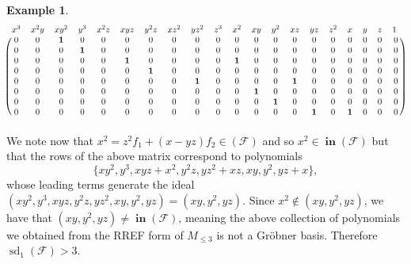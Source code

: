 \documentclass[11pt]{article}
\newcommand{\F}{\mathcal{F}}
\DeclareMathOperator{\Init}{\mathbf{in}}
\DeclareMathOperator{\sd}{sd}
\theoremstyle{definition}
\newtheorem{example}{Example}
\begin{document}
\begin{example}
\[\begin{blockarray}{cccccccccccccccccccc}
		x^3 & x^2y & xy^2 & y^3 & x^2z & xyz & y^2z & xz^2 & yz^2 & z^3 & x^2 & xy & y^2 & xz & yz & z^2 & x & y & z & 1\,\, \\
		\begin{block}{(cccccccccccccccccccc)}
			0 & 0 & \mathbf{1} & 0 & 0 & 0 & 0 & 0 & 0 & 0 & 0 & 0 & 0 & 0 & 0 & 0 & 0 & 0 & 0 & 0 \\
			0 & 0 & 0 & \mathbf{1} & 0 & 0 & 0 & 0 & 0 & 0 & 0 & 0 & 0 & 0 & 0 & 0 & 0 & 0 & 0 & 0 \\
			0 & 0 & 0 & 0 & 0 & \mathbf{1} & 0 & 0 & 0 & 0 & \mathbf{1} & 0 & 0 & 0 & 0 & 0 & 0 & 0 & 0 & 0 \\
			0 & 0 & 0 & 0 & 0 & 0 & \mathbf{1} & 0 & 0 & 0 & 0 & 0 & 0 & 0 & 0 & 0 & 0 & 0 & 0 & 0 \\
			0 & 0 & 0 & 0 & 0 & 0 & 0 & 0 & \mathbf{1} & 0 & 0 & 0 & 0 & \mathbf{1} & 0 & 0 & 0 & 0 & 0 & 0 \\
			0 & 0 & 0 & 0 & 0 & 0 & 0 & 0 & 0 & 0 & 0 & \mathbf{1} & 0 & 0 & 0 & 0 & 0 & 0 & 0 & 0 \\
			0 & 0 & 0 & 0 & 0 & 0 & 0 & 0 & 0 & 0 & 0 & 0 & \mathbf{1} & 0 & 0 & 0 & 0 & 0 & 0 & 0 \\
			0 & 0 & 0 & 0 & 0 & 0 & 0 & 0 & 0 & 0 & 0 & 0 & 0 & 0 & \mathbf{1} & 0 & \mathbf{1} & 0 & 0 & 0 \\
		\end{block}
	\end{blockarray} \] We note now that $x^2 = z^2f_1 + (x - yz)f_2 \in (\F)$ and so $x^2 \in \Init(\F)$ but that the rows of the above matrix correspond to polynomials \[ \{xy^2, y^3, xyz + x^2, y^2z, yz^2 + xz, xy, y^2, yz + x\}, \] whose leading terms generate the ideal $(xy^2, y^3, xyz, y^2z, yz^2, xy, y^2, yz) = (xy, y^2, yz)$. Since $x^2 \notin (xy, y^2, yz)$, we have that $(xy, y^2, yz) \neq \Init(\F)$, meaning the above collection of polynomials we obtained from the RREF form of $M_{\leq 3}$ is not a Gröbner basis. Therefore $\sd_1(\F) > 3$. 


\end{example}
\end{document}
